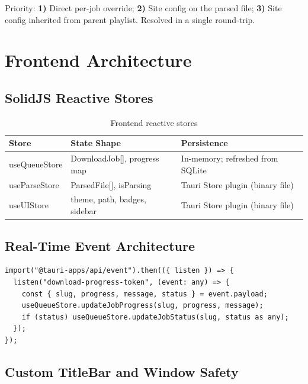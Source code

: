 \documentclass[10pt,letterpaper]{article}
\begin{document}
Priority: \textbf{1)} Direct per-job override; \textbf{2)} Site config on the parsed file;
\textbf{3)} Site config inherited from parent playlist. Resolved in a single round-trip.

\section{Frontend Architecture}

\subsection{SolidJS Reactive Stores}

\begin{table}[H]
\centering\small
\renewcommand{\arraystretch}{1.3}
\begin{tabular}{>{\ttfamily}lll}
\toprule
Store & State Shape & Persistence \\
\midrule
useQueueStore & DownloadJob[], progress map & In-memory; refreshed from SQLite \\
useParseStore & ParsedFile[], isParsing & Tauri Store plugin (binary file) \\
useUIStore & theme, path, badges, sidebar & Tauri Store plugin (binary file) \\
\bottomrule
\end{tabular}
\caption{Frontend reactive stores}
\end{table}

\subsection{Real-Time Event Architecture}

\begin{lstlisting}[caption={Global event listener (store/useQueueStore.ts)}]
import("@tauri-apps/api/event").then(({ listen }) => {
  listen("download-progress-token", (event: any) => {
    const { slug, progress, message, status } = event.payload;
    useQueueStore.updateJobProgress(slug, progress, message);
    if (status) useQueueStore.updateJobStatus(slug, status as any);
  });
});
\end{lstlisting}

\subsection{Custom TitleBar and Window Safety}
\end{document}
